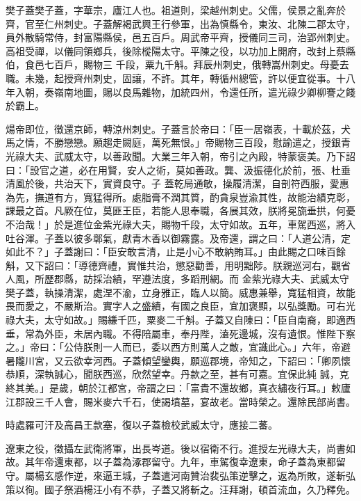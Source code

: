 
\begin{pinyinscope}

 樊子蓋樊子蓋，字華宗，廬江人也。祖道則，梁越州刺史。父儒，侯景之亂奔於齊，官至仁州刺史。子蓋解褐武興王行參軍，出為慎縣令，東汝、北陳二郡太守，員外散騎常侍，封富陽縣侯，邑五百戶。周武帝平齊，授儀同三司，治郢州刺史。高祖受禪，以儀同領鄉兵，後除樅陽太守。平陳之役，以功加上開府，改封上蔡縣伯，食邑七百戶，賜物三
 千段，粟九千斛。拜辰州刺史，俄轉嵩州刺史。母憂去職。未幾，起授齊州刺史，固讓，不許。其年，轉循州總管，許以便宜從事。十八年入朝，奏嶺南地圖，賜以良馬雜物，加統四州，令還任所，遣光祿少卿柳謇之餞於霸上。



 煬帝即位，徵還京師，轉涼州刺史。子蓋言於帝曰：「臣一居嶺表，十載於茲，犬馬之情，不勝戀戀。願趨走闕庭，萬死無恨。」帝賜物三百段，慰諭遣之，授銀青光祿大夫、武威太守，以善政聞。大業三年入朝，帝引之內殿，特蒙褒美。乃下詔曰：「設官之道，必在用賢，安人之術，莫如善政。龔、汲振德化於前，張、杜垂清風於後，共治天下，實資良守。子
 蓋乾局通敏，操履清潔，自剖符西服，愛惠為先，撫道有方，寬猛得所。處脂膏不潤其質，酌貪泉豈渝其性，故能治績克彰，課最之首。凡厥在位，莫匪王臣，若能人思奉職，各展其效，朕將冕旒垂拱，何憂不治哉！」於是進位金紫光祿大夫，賜物千段，太守如故。五年，車駕西巡，將入吐谷渾。子蓋以彼多鄣氣，獻青木香以御霧露。及帝還，謂之曰：「人道公清，定如此不？」子蓋謝曰：「臣安敢言清，止是小心不敢納賄耳。」由此賜之口味百餘斛，又下詔曰：「導德齊禮，實惟共治，懲惡勸善，用明黜陟。朕親巡河右，觀省人風，所歷郡縣，訪採治績，罕遵法度，多蹈刑網。而
 金紫光祿大夫、武威太守樊子蓋，執操清潔，處涅不渝，立身雅正，臨人以簡。威惠兼舉，寬猛相資，故能畏而愛之，不嚴斯治。實字人之盛績，有國之良臣，宜加褒顯，以弘獎勵。可右光祿大夫，太守如故。」賜縑千匹，粟麥二千斛。子蓋又自陳曰：「臣自南裔，即適西垂，常為外臣，未居內職。不得陪屬車，奉丹陛，溘死邊城，沒有遺恨。惟陛下察之。」帝曰：「公侍朕則一人而已，委以西方則萬人之敵，宜識此心。」六年，帝避暑隴川宮，又云欲幸河西。子蓋傾望鑾輿，願巡郡境，帝知之，下詔曰：「卿夙懷恭順，深執誠心，聞朕西巡，欣然望幸。丹款之至，甚有可嘉。宜保此純
 誠，克終其美。」是歲，朝於江都宮，帝謂之曰：「富貴不還故鄉，真衣繡夜行耳。」敕廬江郡設三千人會，賜米麥六千石，使謁墳墓，宴故老。當時榮之。還除民部尚書。



 時處羅可汗及高昌王款塞，復以子蓋檢校武威太守，應接二蕃。



 遼東之役，徵攝左武衛將軍，出長岑道。後以宿衛不行。進授左光祿大夫，尚書如故。其年帝還東都，以子蓋為涿郡留守。九年，車駕復幸遼東，命子蓋為東都留守。屬楊玄感作逆，來逼王城，子蓋遣河南贊治裴弘策逆擊之，返為所敗，遂斬弘策以徇。國子祭酒楊汪小有不恭，子蓋又將斬之。汪拜謝，頓首流血，久乃釋免。




\end{pinyinscope}
